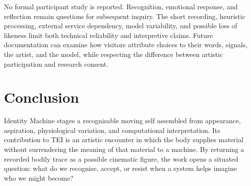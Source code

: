\documentclass[manuscript,screen,nonacm]{acmart}
\begin{document}
No formal participant study is reported. Recognition, emotional response, and reflection remain questions for subsequent inquiry. The short recording, heuristic processing, external service dependency, model variability, and possible loss of likeness limit both technical reliability and interpretive claims. Future documentation can examine how visitors attribute choices to their words, signals, the artist, and the model, while respecting the difference between artistic participation and research consent.

\section{Conclusion}
Identity Machine stages a recognisable moving self assembled from appearance, aspiration, physiological variation, and computational interpretation. Its contribution to TEI is an artistic encounter in which the body supplies material without surrendering the meaning of that material to a machine. By returning a recorded bodily trace as a possible cinematic figure, the work opens a situated question: what do we recognise, accept, or resist when a system helps imagine who we might become?
\end{document}
